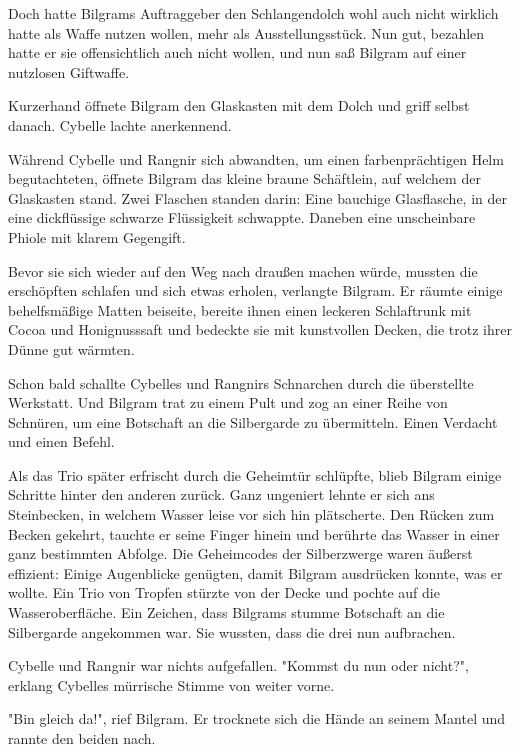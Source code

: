 Doch hatte Bilgrams Auftraggeber den Schlangendolch wohl auch nicht wirklich hatte als Waffe nutzen wollen, mehr als Ausstellungsstück. Nun gut, bezahlen hatte er sie offensichtlich auch nicht wollen, und nun saß Bilgram auf einer nutzlosen Giftwaffe. 

Kurzerhand öffnete Bilgram den Glaskasten mit dem Dolch und griff selbst danach. Cybelle lachte anerkennend.

Während Cybelle und Rangnir sich abwandten, um einen farbenprächtigen Helm begutachteten, öffnete Bilgram das kleine braune Schäftlein, auf welchem der Glaskasten stand. Zwei Flaschen standen darin: Eine bauchige Glasflasche, in der eine dickflüssige schwarze Flüssigkeit schwappte. Daneben eine unscheinbare Phiole mit klarem Gegengift.

\trennzeichen

Bevor sie sich wieder auf den Weg nach draußen machen würde, mussten die erschöpften  schlafen und sich etwas erholen, verlangte Bilgram. Er räumte einige behelfsmäßige Matten beiseite, bereite ihnen einen leckeren Schlaftrunk mit Cocoa und Honignusssaft und bedeckte sie mit kunstvollen Decken, die trotz ihrer Dünne gut wärmten.

Schon bald schallte Cybelles und Rangnirs Schnarchen durch die überstellte Werkstatt. Und Bilgram trat zu einem Pult und zog an einer Reihe von Schnüren, um eine Botschaft an die Silbergarde zu übermitteln. Einen Verdacht und einen Befehl.
 
Als das Trio später erfrischt durch die Geheimtür schlüpfte, blieb Bilgram einige Schritte hinter den anderen zurück. Ganz ungeniert lehnte er sich ans Steinbecken, in welchem Wasser leise vor sich hin plätscherte. Den Rücken zum Becken gekehrt, tauchte er seine Finger hinein und berührte das Wasser in einer ganz bestimmten Abfolge. Die Geheimcodes der Silberzwerge waren äußerst effizient: Einige Augenblicke genügten, damit Bilgram ausdrücken konnte, was er wollte. Ein Trio von Tropfen stürzte von der Decke und pochte auf die Wasseroberfläche. Ein Zeichen, dass  Bilgrams stumme Botschaft an die Silbergarde angekommen war. Sie wussten, dass die drei nun aufbrachen. 

Cybelle und Rangnir war nichts aufgefallen. "Kommst du nun oder nicht?", erklang Cybelles mürrische Stimme von weiter vorne. 

"Bin gleich da!", rief Bilgram. Er trocknete sich die Hände an seinem Mantel und rannte den beiden nach.

\trennzeichen

